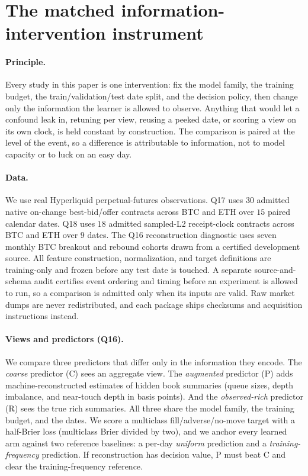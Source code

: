 \section{The matched information-intervention instrument}
\label{sec:setup}

\paragraph{Principle.} Every study in this paper is one intervention: fix the model
family, the training budget, the train/validation/test date split, and the decision
policy, then change only the information the learner is allowed to observe. Anything that
would let a confound leak in, retuning per view, reusing a peeked date, or scoring a
view on its own clock, is held constant by construction. The comparison is paired at
the level of the event, so a difference is attributable to information, not to model
capacity or to luck on an easy day.

\paragraph{Data.} We use real Hyperliquid perpetual-futures observations. Q17 uses $30$
admitted native on-change best-bid/offer contracts across BTC and ETH over $15$ paired
calendar dates. Q18 uses $18$ admitted sampled-L2 receipt-clock contracts across BTC and
ETH over $9$ dates. The Q16 reconstruction diagnostic uses seven monthly BTC breakout and
rebound cohorts drawn from a certified development source. All feature construction,
normalization, and target definitions are training-only and frozen before any test date is
touched. A separate source-and-schema audit certifies event ordering and timing before an
experiment is allowed to run, so a comparison is admitted only when its inputs are valid. Raw market dumps are never redistributed, and each package ships checksums and acquisition
instructions instead.

\paragraph{Views and predictors (Q16).} We compare three predictors that differ only in
the information they encode. The \emph{coarse} predictor (C) sees an aggregate view. The
\emph{augmented} predictor (P) adds machine-reconstructed estimates of hidden book
summaries (queue sizes, depth imbalance, and near-touch depth in basis points). And the
\emph{observed-rich} predictor (R) sees the true rich summaries. All three share the model
family, the training budget, and the dates. We score a multiclass fill/adverse/no-move
target with a half-Brier loss (multiclass Brier divided by two), and we anchor every
learned arm against two reference baselines: a per-day \emph{uniform} prediction and a
\emph{training-frequency} prediction. If reconstruction has decision value, P must beat C
and clear the training-frequency reference.

